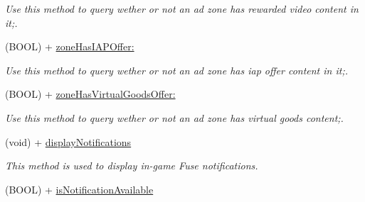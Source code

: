 \begin{DoxyCompactItemize}
\begin{DoxyCompactList}\small\item\em Use this method to query wether or not an ad zone has rewarded video content in it;. \end{DoxyCompactList}\item 
(B\+O\+O\+L) + \hyperlink{interface_fuse_s_d_k_adb67f99bc2972de6774949fc2849f548}{zone\+Has\+I\+A\+P\+Offer\+:}
\begin{DoxyCompactList}\small\item\em Use this method to query wether or not an ad zone has iap offer content in it;. \end{DoxyCompactList}\item 
(B\+O\+O\+L) + \hyperlink{interface_fuse_s_d_k_a898ce4e1d5235fd40627429d1f7bf138}{zone\+Has\+Virtual\+Goods\+Offer\+:}
\begin{DoxyCompactList}\small\item\em Use this method to query wether or not an ad zone has virtual goods content;. \end{DoxyCompactList}\item 
(void) + \hyperlink{interface_fuse_s_d_k_a279e4cb8e95a3e78197761156a7de50d}{display\+Notifications}
\begin{DoxyCompactList}\small\item\em This method is used to display in-\/game Fuse notifications. \end{DoxyCompactList}\item 
\hypertarget{interface_fuse_s_d_k_a23c30bc15f208daf639ece250b8a5935}{}(B\+O\+O\+L) + \hyperlink{interface_fuse_s_d_k_a23c30bc15f208daf639ece250b8a5935}{is\+Notification\+Available}\label{interface_fuse_s_d_k_a23c30bc15f208daf639ece250b8a5935}


\end{DoxyCompactItemize}
